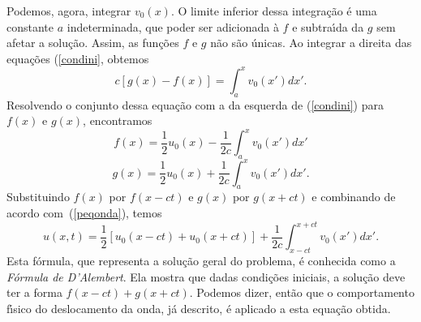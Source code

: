 Podemos, agora, integrar $v_0 (x)$. O limite inferior dessa
integra\c{c}\~ao \'e uma constante $a$ indeterminada, que poder ser
adicionada \`a $f$ e subtra\'{\i}da da $g$ sem afetar a solu\c{c}\~ao.
Assim, as fun\c{c}\~oes $f$ e $g$ n\~ao s\~ao \'unicas. Ao integrar a
direita das equa\c{c}\~oes (\ref{condini}, obtemos
\begin{equation}
 c[g(x)-f(x)]=\int_{a}^{x} v_0 (x')dx'.
\end{equation}
Resolvendo o conjunto dessa equa\c{c}\~ao com a da esquerda de
(\ref{condini}) para $f(x)$ e $g(x)$, encontramos
\begin{equation}
 f(x)=\frac{1}{2}u_0 (x)-\frac{1}{2c}\int_{a}^{x} v_0 (x')dx'
\end{equation}
\begin{equation}
 g(x)=\frac{1}{2}u_0 (x)+\frac{1}{2c}\int_{a}^{x} v_0 (x')dx'.
\end{equation}
Substituindo $f(x)$ por $f(x-ct)$ e $g(x)$ por $g(x+ct)$ e combinando de
acordo com~(\ref{peqonda}), temos
\begin{equation}
u(x,t)=\frac{1}{2}[u_0 (x-ct)+u_0 (x+ct)]+\frac{1}{2c}\int_{x-ct}^{x+ct} v_0 (x')dx'.
\end{equation}
Esta f\'ormula, que representa a solu\c{c}\~ao geral do problema, \'e
conhecida como a {\it F\'ormula de D'Alembert}. Ela mostra que dadas
condi\c{c}\~oes iniciais, a solu\c{c}\~ao deve ter a forma
$f(x-ct)+g(x+ct)$. Podemos dizer, ent\~ao que o comportamento
f\'{\i}sico do deslocamento da onda, j\'a descrito, \'e aplicado a esta
equa\c{c}\~ao obtida.

